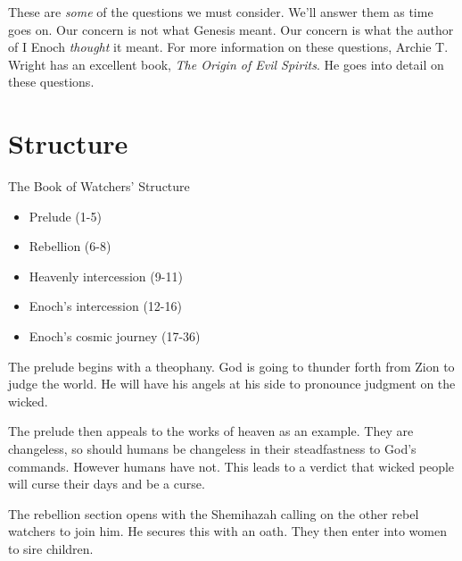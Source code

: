 \documentclass{beamer}
\begin{document}
\begin{frame}
  These are \emph{some} of the questions we must consider.
  We'll answer them as time goes on.
  Our concern is not what Genesis meant.
  Our concern is what the author of I Enoch \emph{thought} it meant.
  For more information on these questions, Archie T. Wright has an excellent book, \emph{The Origin of Evil Spirits}.
  He goes into detail on these questions.
\end{frame}

\section{Structure}

\begin{frame}
  \huge{The Book of Watchers' Structure}
\end{frame}

\begin{frame}
  \begin{itemize}
	\item Prelude (1-5)\pause
	\item Rebellion (6-8)\pause
	\item Heavenly intercession (9-11)\pause
	\item Enoch's intercession (12-16)\pause
	\item Enoch's cosmic journey (17-36)
  \end{itemize}
\end{frame}

\begin{frame}
  The prelude begins with a theophany.
  God is going to thunder forth from Zion to judge the world.
  He will have his angels at his side to pronounce judgment on the wicked.
\end{frame}

\begin{frame}
  The prelude then appeals to the works of heaven as an example.
  They are changeless, so should humans be changeless in their steadfastness to God's commands.
  However humans have not.
  This leads to a verdict that wicked people will curse their days and be a curse.
\end{frame}

\begin{frame}
  The rebellion section opens with the Shemihazah calling on the other rebel watchers to join him.
  He secures this with an oath.
  They then enter into women to sire children.
\end{frame}
\end{document}

